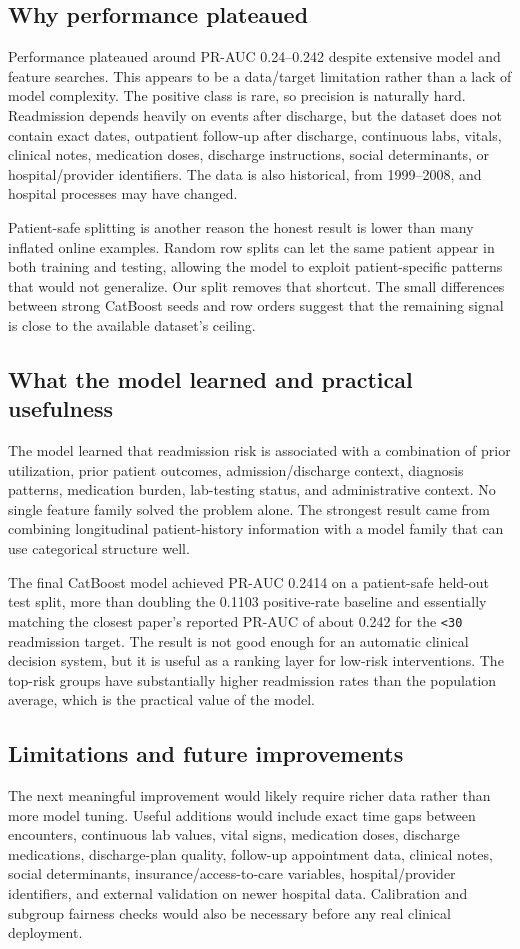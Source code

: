 \documentclass[10pt]{article}
\newcommand{\tightsubsection}[1]{\vspace{2pt}\subsection{#1}\vspace{-3pt}}
\begin{document}
\tightsubsection{Why performance plateaued}

Performance plateaued around PR-AUC 0.24--0.242 despite extensive model and feature searches. This appears to be a data/target limitation rather than a lack of model complexity. The positive class is rare, so precision is naturally hard. Readmission depends heavily on events after discharge, but the dataset does not contain exact dates, outpatient follow-up after discharge, continuous labs, vitals, clinical notes, medication doses, discharge instructions, social determinants, or hospital/provider identifiers. The data is also historical, from 1999--2008, and hospital processes may have changed.

Patient-safe splitting is another reason the honest result is lower than many inflated online examples. Random row splits can let the same patient appear in both training and testing, allowing the model to exploit patient-specific patterns that would not generalize. Our split removes that shortcut. The small differences between strong CatBoost seeds and row orders suggest that the remaining signal is close to the available dataset's ceiling.

\tightsubsection{What the model learned and practical usefulness}

The model learned that readmission risk is associated with a combination of prior utilization, prior patient outcomes, admission/discharge context, diagnosis patterns, medication burden, lab-testing status, and administrative context. No single feature family solved the problem alone. The strongest result came from combining longitudinal patient-history information with a model family that can use categorical structure well.

The final CatBoost model achieved PR-AUC 0.2414 on a patient-safe held-out test split, more than doubling the 0.1103 positive-rate baseline and essentially matching the closest paper's reported PR-AUC of about 0.242 for the \texttt{<30} readmission target. The result is not good enough for an automatic clinical decision system, but it is useful as a ranking layer for low-risk interventions. The top-risk groups have substantially higher readmission rates than the population average, which is the practical value of the model.

\tightsubsection{Limitations and future improvements}

The next meaningful improvement would likely require richer data rather than more model tuning. Useful additions would include exact time gaps between encounters, continuous lab values, vital signs, medication doses, discharge medications, discharge-plan quality, follow-up appointment data, clinical notes, social determinants, insurance/access-to-care variables, hospital/provider identifiers, and external validation on newer hospital data. Calibration and subgroup fairness checks would also be necessary before any real clinical deployment.
\end{document}
